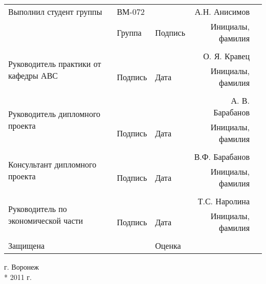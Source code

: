 \begin{tabular}{p{12em}p{5em}@{}p{5em}@{}r@{}r}
Выполнил студент группы & \hrulefill{} ВМ-072 & \hrulefill{}  & \hrulefill{} А.Н. Анисимов \\
 &  \small{Группа}  & \small{Подпись} &\small{Инициалы, фамилия} \\
& & & \\
\multirow{2}{12em}{Руководитель практики\newline{} от кафедры АВС} & \hrulefill{} & \hrulefill{} & \hrulefill{} О. Я. Кравец \\
 & \small{Подпись}  & \small{Дата} & \small{Инициалы, фамилия} \\
 & & & \\
\multirow{2}{12em}{Руководитель дипломного  проекта} & \hrulefill{} & \hrulefill{} & \hrulefill{} А. В. Барабанов \\
 & \small{Подпись}  & \small{Дата} & \small{Инициалы, фамилия} \\
& & & \\
\multirow{2}{12em}{Консультант дипломного проекта} & \hrulefill{} & \hrulefill{} & \hrulefill{} В.Ф. Барабанов \\
 & \small{Подпись}  & \small{Дата} & \small{Инициалы, фамилия} \\
& & & \\
\multirow{2}{12em}{Руководитель по экономической части} & \hrulefill{} & \hrulefill{} & \hrulefill{} Т.С. Наролина \\
 & \small{Подпись}  & \small{Дата} & \small{Инициалы, фамилия} \\
& & & \\
Защищена \hrulefill{} &  & Оценка \hrulefill{} & \hrulefill{} 
\end{tabular}

\vspace{1.5em}

\begin{center}
г. Воронеж \\*
2011 г.
\end{center}

